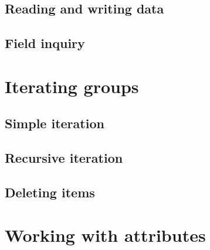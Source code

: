 \subsection{Reading and writing data}

\subsection{Field inquiry}

\section{Iterating groups}\label{section:group_iteration}

\subsection{Simple iteration}

\subsection{Recursive iteration}

\subsection{Deleting items}



\section{Working with attributes}


